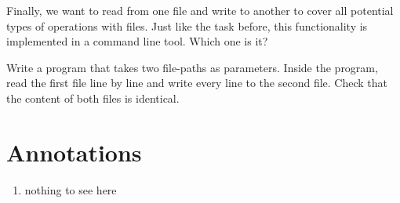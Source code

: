\documentclass{dcbl/challenge}
\begin{document}
\begin{aufgabe}
    Finally, we want to read from one file and write to another to cover all potential types of operations with files. Just like the task before, this functionality is implemented in a command line tool. Which one is it?
    
    Write a program that takes two file-paths as parameters.
    Inside the program, read the first file line by line and write every line to the second file. Check that the content of both files is identical.
\end{aufgabe}


\section*{Annotations}
\begin{enumerate}
    \item nothing to see here
\end{enumerate}
\end{document}
